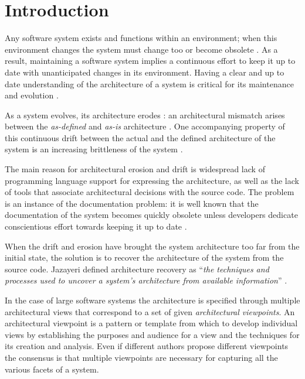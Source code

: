 \documentclass[preprint,12pt]{elsarticle}
\begin{document}
\section{Introduction} \label{sec:Introduction}

Any software system exists and functions within an environment; when this environment changes the system must change too or become obsolete \cite{lehman-softev}. As a result, maintaining a software system implies a continuous effort to keep it up to date with unanticipated changes in its environment. Having a clear and up to date understanding of the architecture of a system is critical for its maintenance and evolution \cite{Duca09c, pollet-sar}.

As a system evolves, its architecture erodes \cite{perry-foundations}: an architectural mismatch arises between the {\em as-defined} and {\em as-is} architecture \cite{garlan-mismatch}. One accompanying property of this continuous drift between the actual and the defined architecture of the system is an increasing brittleness of the system \cite{perry-foundations}. 

The main reason for architectural erosion and drift is widespread lack of programming language support for expressing the architecture, as well as the lack of tools that associate architectural decisions with the source code. The problem is an instance of the documentation problem: it is well known that the documentation of the system becomes quickly obsolete unless developers dedicate conscientious effort towards keeping it up to date \cite{riva-report}.

When the drift and erosion have brought the system architecture too far from the initial state, the solution is to recover the architecture of the system from the source code. Jazayeri defined architecture recovery as ``{\em the techniques and processes used to uncover a system's architecture from available information}'' \cite{jaza-archevo}. 

In the case of large software systems the architecture is specified through multiple architectural views that correspond to a set of given {\em architectural viewpoints}. An architectural viewpoint is a pattern or template from which to develop individual views by establishing the purposes and audience for a view and the techniques for its creation and analysis. Even if different authors propose different viewpoints \cite{bass-architecture, kruchten-4plus, hof-apparch} the consensus is that multiple viewpoints are necessary for capturing all the various facets of a system.
\end{document}
